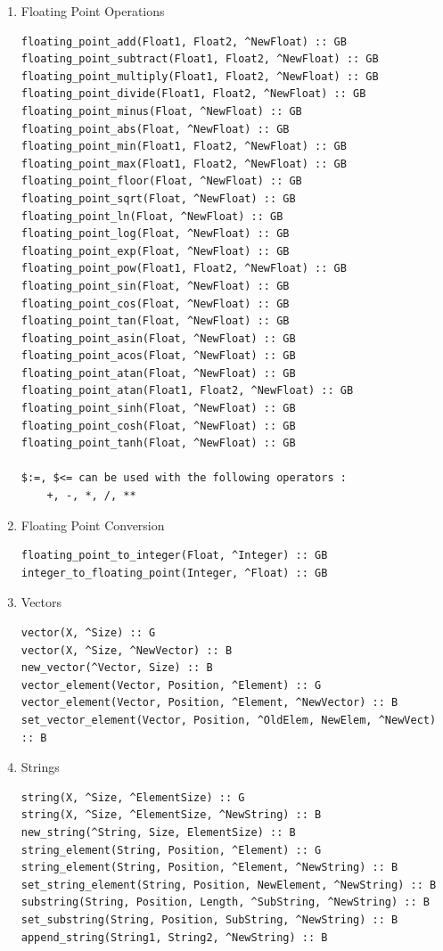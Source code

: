 \begin{enumerate}
\begin{verbatim}
The following operators are available :
   $=:=, $=\=, $<, $=<, $>, $>=

\end{verbatim}
\item Floating Point Operations
\begin{verbatim}
floating_point_add(Float1, Float2, ^NewFloat) :: GB
floating_point_subtract(Float1, Float2, ^NewFloat) :: GB
floating_point_multiply(Float1, Float2, ^NewFloat) :: GB
floating_point_divide(Float1, Float2, ^NewFloat) :: GB
floating_point_minus(Float, ^NewFloat) :: GB
floating_point_abs(Float, ^NewFloat) :: GB
floating_point_min(Float1, Float2, ^NewFloat) :: GB
floating_point_max(Float1, Float2, ^NewFloat) :: GB
floating_point_floor(Float, ^NewFloat) :: GB
floating_point_sqrt(Float, ^NewFloat) :: GB
floating_point_ln(Float, ^NewFloat) :: GB
floating_point_log(Float, ^NewFloat) :: GB
floating_point_exp(Float, ^NewFloat) :: GB
floating_point_pow(Float1, Float2, ^NewFloat) :: GB
floating_point_sin(Float, ^NewFloat) :: GB
floating_point_cos(Float, ^NewFloat) :: GB
floating_point_tan(Float, ^NewFloat) :: GB
floating_point_asin(Float, ^NewFloat) :: GB
floating_point_acos(Float, ^NewFloat) :: GB
floating_point_atan(Float, ^NewFloat) :: GB
floating_point_atan(Float1, Float2, ^NewFloat) :: GB
floating_point_sinh(Float, ^NewFloat) :: GB
floating_point_cosh(Float, ^NewFloat) :: GB
floating_point_tanh(Float, ^NewFloat) :: GB

$:=, $<= can be used with the following operators :
    +, -, *, /, **

\end{verbatim}
\item Floating Point Conversion
\begin{verbatim}
floating_point_to_integer(Float, ^Integer) :: GB
integer_to_floating_point(Integer, ^Float) :: GB

\end{verbatim}
\item Vectors
\begin{verbatim}
vector(X, ^Size) :: G
vector(X, ^Size, ^NewVector) :: B
new_vector(^Vector, Size) :: B
vector_element(Vector, Position, ^Element) :: G
vector_element(Vector, Position, ^Element, ^NewVector) :: B
set_vector_element(Vector, Position, ^OldElem, NewElem, ^NewVect) :: B

\end{verbatim}
\item Strings
\begin{verbatim}
string(X, ^Size, ^ElementSize) :: G
string(X, ^Size, ^ElementSize, ^NewString) :: B
new_string(^String, Size, ElementSize) :: B
string_element(String, Position, ^Element) :: G
string_element(String, Position, ^Element, ^NewString) :: B
set_string_element(String, Position, NewElement, ^NewString) :: B
substring(String, Position, Length, ^SubString, ^NewString) :: B
set_substring(String, Position, SubString, ^NewString) :: B
append_string(String1, String2, ^NewString) :: B


\end{verbatim}
\end{enumerate}
